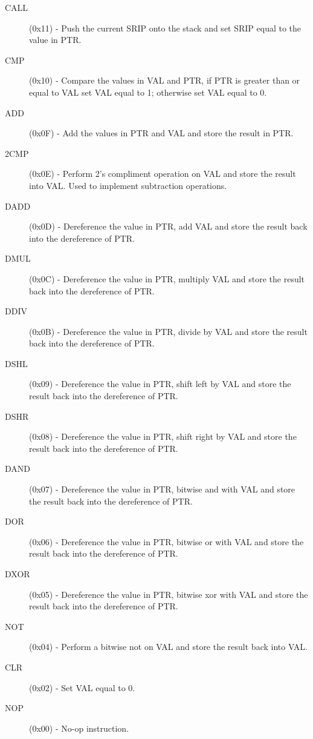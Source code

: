 \begin{description}
\item[CALL] (0x11) - 
Push the current SRIP onto the stack and set SRIP equal to the value in PTR.

\item[CMP] (0x10) - 
Compare the values in VAL and PTR, if PTR is greater than or equal to VAL
set VAL equal to 1; otherwise set VAL equal to 0. 

\item[ADD] (0x0F) - 
Add the values in PTR and VAL and store the result in PTR.

\item[2CMP] (0x0E) - 
Perform 2's compliment operation on VAL and store the result into VAL.
Used to implement subtraction operations.

\item[DADD] (0x0D) - 
Dereference the value in PTR, add VAL and store the result back into the dereference 
of PTR. 

\item[DMUL] (0x0C) - 
Dereference the value in PTR, multiply VAL and store the result back into the dereference
 of PTR. 

\item[DDIV] (0x0B) - 
Dereference the value in PTR, divide by VAL and store the result back into the 
dereference of PTR. 

\item[DSHL] (0x09) - 
Dereference the value in PTR, shift left by VAL and store the result back into the 
dereference of PTR. 

\item[DSHR] (0x08) - 
Dereference the value in PTR, shift right by VAL and store the result back into the 
dereference of PTR. 

\item[DAND] (0x07) - 
Dereference the value in PTR, bitwise and with VAL and store the result back into the 
dereference of PTR. 

\item[DOR] (0x06) - 
Dereference the value in PTR, bitwise or with VAL and store the result back into the 
dereference of PTR. 

\item[DXOR] (0x05) - 
Dereference the value in PTR, bitwise xor with VAL and store the result back into the 
dereference of PTR. 

\item[NOT] (0x04) - 
Perform a bitwise not on VAL and store the result back into VAL. 

\item[CLR] (0x02) - 
Set VAL equal to 0. 

\item[NOP] (0x00) - 
No-op instruction.
\end{description}

